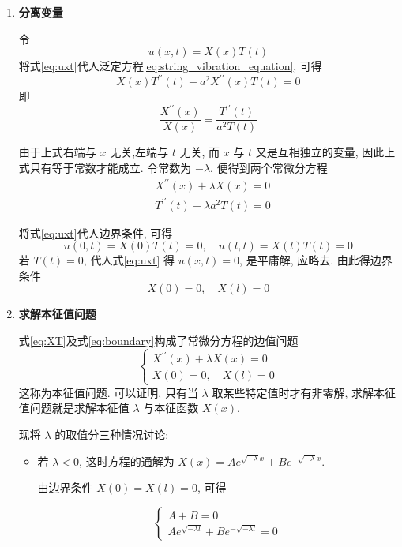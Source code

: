 \begin{enumerate}
  \item \textbf{分离变量}

    令
    \begin{equation}
        u(x, t)=X(x) T(t)
        \label{eq:uxt}
    \end{equation}
    将式\eqref{eq:uxt}代人泛定方程\eqref{eq:string_vibration_equation}, 可得
    $$
    X(x) T^{\prime \prime}(t)-a^{2} X^{\prime \prime}(x) T(t)=0
    $$
即
$$
\frac{X^{\prime \prime}(x)}{X(x)}=\frac{T^{\prime \prime}(t)}{a^{2} T(t)}
$$

由于上式右端与 $x$ 无关,左端与 $t$ 无关, 而 $x$ 与 $t$ 又是互相独立的变量, 
因此上式只有等于常数才能成立. 令常数为 $-\lambda$, 便得到两个常微分方程
\begin{equation}
    \begin{aligned}
        & X^{\prime \prime}(x)+\lambda X(x)=0 \\
        & T^{\prime \prime}(t)+\lambda a^{2} T(t)=0
        \end{aligned}
        \label{eq:XT}
\end{equation}

将式\eqref{eq:uxt}代人边界条件, 可得
$$
u(0, t)=X(0) T(t)=0, \quad u(l, t)=X(l) T(t)=0
$$
若 $T(t)=0$, 代人式\eqref{eq:uxt} 得 $u(x, t)=0$, 是平庸解, 应略去. 由此得边界条件
\begin{equation}
    X(0)=0, \quad X(l)=0
    \label{eq:boundary}
\end{equation}

\item \textbf{求解本征值问题}

式\eqref{eq:XT}及式\eqref{eq:boundary}构成了常微分方程的边值问题
$$
\left\{\begin{array}{l}
X^{\prime \prime}(x)+\lambda X(x)=0 \\
X(0)=0, \quad X(l)=0
\end{array}\right.
$$
这称为本征值问题. 
可以证明, 只有当 $\lambda$ 取某些特定值时才有非零解,
求解本征值问题就是求解本征值 $\lambda$ 与本征函数 $X(x)$.

现将 $\lambda$ 的取值分三种情况讨论:

\begin{itemize}
    \item 若 $\lambda<0$, 这时方程的通解为 $X(x)=A e^{\sqrt{-\lambda} x}+B e^{-\sqrt{-\lambda} x}$.

        由边界条件 $X(0)=X(l)=0$, 可得
        
        $$
        \left\{\begin{array}{l}
        A+B=0 \\
        A e^{\sqrt{-\lambda l}}+B e^{-\sqrt{-\lambda l}}=0
        \end{array}\right.
        $$
        

\end{itemize}
\end{enumerate}
